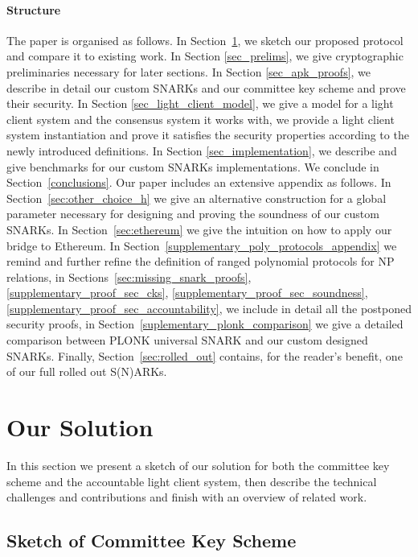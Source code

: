 \paragraph{Structure} The paper is organised as follows. In Section~\ref{sec:sketch}, we sketch our proposed protocol and compare it to existing work. 
In Section \ref{sec_prelims}, we give cryptographic preliminaries necessary for later sections. In Section \ref{sec_apk_proofs}, we describe in detail our 
custom SNARKs and our committee key scheme and prove their security. In Section \ref{sec_light_client_model}, we give a model for a light client system and 
the consensus system it works with, we provide a light client system instantiation and prove it satisfies the security properties according to the newly 
introduced definitions. In Section \ref{sec_implementation}, we describe and give benchmarks for our custom SNARKs implementations. We conclude in 
Section~\ref{conclusions}. Our paper includes an extensive appendix as follows. In Section~\ref{sec:other_choice_h} we give an alternative construction for a global 
parameter necessary for designing and proving the soundness of our custom SNARKs. In Section~\ref{sec:ethereum} we give the intuition on how to apply our 
bridge to Ethereum. In Section~\ref{supplementary_poly_protocols_appendix} we remind and further refine the definition of ranged polynomial protocols for 
NP relations, in Sections~\ref{sec:missing_snark_proofs}, \ref{supplementary_proof_sec_cks}, \ref{supplementary_proof_sec_soundness}, 
\ref{supplementary_proof_sec_accountability}, we include in detail all the postponed security proofs, in Section~\ref{suplementary_plonk_comparison} 
we give a detailed comparison between PLONK universal SNARK and our custom designed SNARKs. Finally, Section~\ref{sec:rolled_out} contains, 
for the reader's benefit, one of our full rolled out S(N)ARKs. 
\section{Our Solution} 
\label{sec:sketch}

In this section we present a sketch of our solution for both the committee key scheme and the accountable light client system, 
then describe the technical challenges and contributions and finish with an overview of related work.

\subsection{Sketch of Committee Key Scheme}

